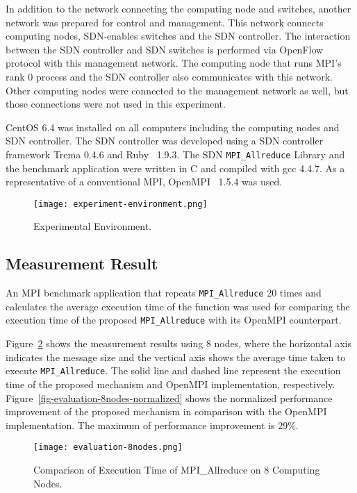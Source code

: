 In addition to the network connecting the computing node and switches,
another network was prepared for control and management. This network
connects computing nodes, SDN-enables switches and the SDN controller.
The interaction between the SDN controller and SDN switches is performed
via OpenFlow protocol with this management network. The computing node
that runs MPI's rank 0 process and the SDN controller also communicates
with this network. Other computing nodes were connected to the
management network as well, but those connections were not used in this
experiment.

CentOS 6.4 was installed on all computers including the computing nodes
and SDN controller. The SDN controller was developed using a SDN
controller framework Trema \cite{trema} 0.4.6 and Ruby~\cite{ruby}
1.9.3. The SDN \texttt{MPI\_Allreduce} Library and the benchmark
application were written in C and compiled with gcc 4.4.7. As a
representative of a conventional MPI, OpenMPI~\cite{Gabriel2004} 1.5.4
was used.

\begin{figure}[htbp]
    \centering
    \texttt{[image: experiment-environment.png]}
    \caption{Experimental Environment.}%
    \label{fig-experiment-environment}
\end{figure}

\hypertarget{measurement-result}{%
\subsection{Measurement Result}\label{measurement-result}}

An MPI benchmark application that repeats \texttt{MPI\_Allreduce} 20
times and calculates the average execution time of the function was used
for comparing the execution time of the proposed \texttt{MPI\_Allreduce}
with its OpenMPI counterpart.

Figure~\ref{fig-evaluation-8nodes} shows the measurement results using 8
nodes, where the horizontal axis indicates the message size and the
vertical axis shows the average time taken to execute
\texttt{MPI\_Allreduce}. The solid line and dashed line represent the
execution time of the proposed mechanism and OpenMPI implementation,
respectively. Figure~\ref{fig-evaluation-8nodes-normalized} shows the
normalized performance improvement of the proposed mechanism in
comparison with the OpenMPI implementation. The maximum of performance
improvement is 29\%.

\begin{figure}[htbp]
    \centering
    \texttt{[image: evaluation-8nodes.png]}
    \caption{Comparison of Execution Time of MPI\_Allreduce on 8 Computing Nodes.}%
    \label{fig-evaluation-8nodes}
\end{figure}


